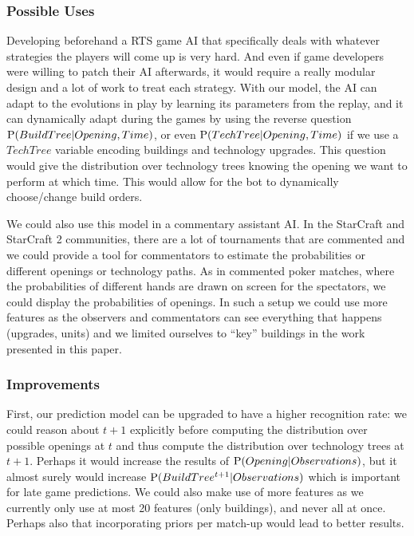 \subsubsection{Possible Uses}
Developing beforehand a RTS game AI that specifically deals with whatever strategies the players will come up is very hard. And even if game developers were willing to patch their AI afterwards, it would require a really modular design and a lot of work to treat each strategy. With our model, the AI can adapt to the evolutions in play by learning its parameters from the replay, and it can dynamically adapt during the games by using the reverse question $\mathrm{P}(BuildTree | Opening,Time)$, or even $\mathrm{P}(TechTree | Opening, Time)$ if we use a $TechTree$ variable encoding buildings and technology upgrades. This question would give the distribution over technology trees knowing the opening we want to perform at which time. This would allow for the bot to dynamically choose/change build orders.

We could also use this model in a commentary assistant AI. In the StarCraft and StarCraft 2 communities, there are a lot of  tournaments that are commented and we could provide a tool for commentators to estimate the probabilities or different openings or technology paths. As in commented poker matches, where the probabilities of different hands are drawn on screen for the spectators, we could display the probabilities of openings. In such a setup we could use more features as the observers and commentators can see everything that happens (upgrades, units) and we limited ourselves to ``key'' buildings in the work presented in this paper.

\subsubsection{Improvements}

First, our prediction model can be upgraded to have a higher recognition rate: we could reason about $t+1$ explicitly before computing the distribution over possible openings at $t$ and thus compute the distribution over technology trees at $t+1$. Perhaps it would increase the results of $\mathrm{P}(Opening|Observations)$, but it almost surely would increase $\mathrm{P}(BuildTree^{t+1}|Observations)$ which is important for late game predictions. We could also make use of more features as we currently only use at most 20 features (only buildings), and never all at once. Perhaps also that incorporating priors per match-up would lead to better results.

